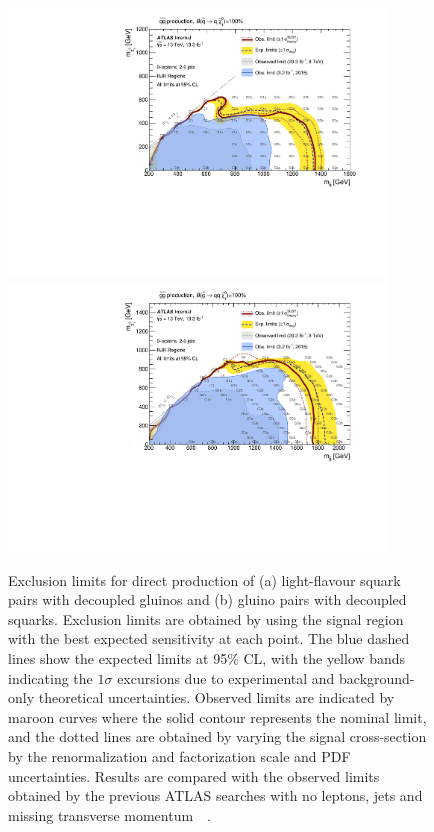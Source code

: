 \begin{figure}[tbph]
\begin{center}
\includegraphics[width=0.9\textwidth]{figures/ATLAS-CONF-2016-078_INT/Sensitivity/RJR/atlasCLs_SS_direct_showSR}
\includegraphics[width=0.9\textwidth]{figures/ATLAS-CONF-2016-078_INT/Sensitivity/RJR/atlasCLs_GG_direct_showSR}
\end{center}
\caption{Exclusion limits for direct production of (a) light-flavour squark pairs with decoupled gluinos and (b) gluino pairs with decoupled squarks.
Exclusion limits are obtained by using the signal region with the best expected sensitivity at each point.
The blue dashed lines show the expected limits at 95\% CL, with the yellow bands indicating the $1\sigma$ excursions due to experimental and background-only  theoretical uncertainties.
Observed limits are indicated by maroon curves where the solid contour represents the nominal limit, and the dotted lines are obtained by varying the signal cross-section by the renormalization and factorization scale and PDF uncertainties.
Results are compared with the observed limits obtained by the previous ATLAS searches with no leptons, jets and missing transverse momentum~~\cite{SUSY-2015-06,SUSY-2013-02}.}
\label{fig:sensitivitytext}
\end{figure}

